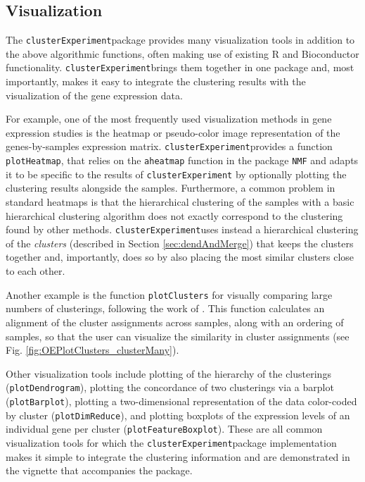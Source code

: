 \documentclass[10pt,letterpaper]{article}
\newcommand{\f}[1]{\texttt{#1}}
\newcommand{\CE}{\f{clusterExperiment}}
\begin{document}
\subsection{Visualization}\label{sec:visualization}

The \CE package provides many visualization tools in addition to the above algorithmic functions, often making use of existing R and Bioconductor functionality. \CE brings them together in one package and, most importantly, makes it easy to integrate the clustering results with the visualization of the gene expression data.

For example, one of the most frequently used visualization methods in gene expression studies is the heatmap or pseudo-color image representation of the genes-by-samples expression matrix. 
\CE provides a function \f{plotHeatmap}, that relies on the \texttt{aheatmap} function in the package \texttt{NMF} \cite{aheatmap} and adapts it to be specific to the results of \f{clusterExperiment} by optionally plotting the clustering results alongside the samples. Furthermore, a common problem in standard heatmaps is that the hierarchical clustering of the samples with a basic hierarchical clustering algorithm does not exactly correspond to the clustering found by other methods. \CE uses instead a hierarchical clustering of the {\em clusters} (described in Section \ref{sec:dendAndMerge}) that keeps the clusters together and, importantly, does so by also placing the most similar clusters close to each other. 

Another example is the function \f{plotClusters} for visually comparing large numbers of clusterings, following the work of \cite{Wilkerson:2010hl}. This function calculates an alignment of the cluster assignments across samples, along with an ordering of samples, so that the user can visualize the similarity in cluster assignments (see Fig. \ref{fig:OEPlotClusters_clusterMany}).

Other visualization tools include plotting of the hierarchy of the clusterings (\f{plotDendrogram}), plotting the concordance of two clusterings via a barplot (\f{plotBarplot}), plotting a two-dimensional representation of the data color-coded by cluster (\f{plotDimReduce}), and  plotting boxplots of the expression levels of an individual gene per cluster (\f{plotFeatureBoxplot}). These are all common visualization tools for which the \CE package implementation makes it simple to integrate the clustering information and are demonstrated in the vignette that accompanies the package.
\end{document}
